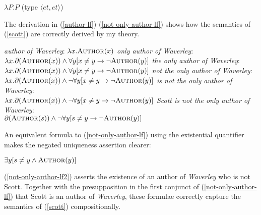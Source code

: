 \begin{exe}
	\ex $\lambda P . P$ (type $\langle et, et \rangle$)
\end{exe}

The derivation in (\ref{author-lf})-(\ref{not-only-author-lf}) shows how the semantics of (\ref{scott}) are correctly derived by my theory.

\begin{exe}
	\ex \label{author-lf} \textit{author of Waverley}: $\lambda x . \textsc{Author}(x)$
	\ex \textit{only author of Waverley}: $\lambda x . \partial(\textsc{Author}(x)) \land \forall y [ x \ne y \to \neg \textsc{Author}(y) ]$
	\ex \textit{the only author of Waverley}: $\lambda x . \partial(\textsc{Author}(x)) \land \forall y [ x \ne y \to \neg \textsc{Author}(y) ]$
	\ex \textit{not the only author of Waverley}: \\ $\lambda x . \partial(\textsc{Author}(x)) \land \neg  \forall y [ x \ne y \to \neg \textsc{Author}(y) ]$
	\ex \textit{is not the only author of Waverley}: \\ $\lambda x . \partial(\textsc{Author}(x)) \land \neg  \forall y [ x \ne y \to \neg \textsc{Author}(y) ]$
	\ex \label{not-only-author-lf} \textit{Scott is not the only author of Waverley}: \\ $\partial(\textsc{Author}(s)) \land \neg \forall y [ s \ne y \to \neg \textsc{Author}(y) ]$
\end{exe}

An equivalent formula to (\ref{not-only-author-lf}) using the existential quantifier makes the negated uniqueness assertion clearer:

\begin{exe}
	\ex \label{not-only-author-lf2} $\exists y [ s \ne y \land \textsc{Author}(y) ]$
\end{exe}

(\ref{not-only-author-lf2}) asserts the existence of an author of \textit{Waverley} who is not Scott. Together with the presupposition in the first conjunct of (\ref{not-only-author-lf}) that Scott is an author of \textit{Waverley}, these formulae correctly capture the semantics of (\ref{scott}) compositionally.